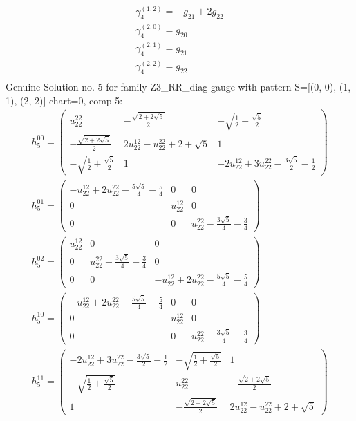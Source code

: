 \documentclass[a4paper, 11pt, twoside, onecolumn]{article}
\begin{document}
\begin{landscape}
\begin{gather*}
	 \gamma^{(1, 2)}_4=- g_{21} + 2 g_{22}\\ 
	 \gamma^{(2, 0)}_4=g_{20}\\ 
	 \gamma^{(2, 1)}_4=g_{21}\\ 
	 \gamma^{(2, 2)}_4=g_{22}\\ 
\end{gather*} 
Genuine Solution no. 5 for family Z3_RR_diag-gauge with pattern S=[(0, 0), (1, 1), (2, 2)] chart=0, comp 5: 
\begin{gather*} 
	 h_5^{00}=\begin{pmatrix}u^{22}_{22} & - \frac{\sqrt{2 + 2 \sqrt{5}}}{2} & - \sqrt{\frac{1}{2} + \frac{\sqrt{5}}{2}}\\- \frac{\sqrt{2 + 2 \sqrt{5}}}{2} & 2 u^{12}_{22} - u^{22}_{22} + 2 + \sqrt{5} & 1\\- \sqrt{\frac{1}{2} + \frac{\sqrt{5}}{2}} & 1 & - 2 u^{12}_{22} + 3 u^{22}_{22} - \frac{3 \sqrt{5}}{2} - \frac{1}{2}\end{pmatrix}\\ 
	 h_5^{01}=\begin{pmatrix}- u^{12}_{22} + 2 u^{22}_{22} - \frac{5 \sqrt{5}}{4} - \frac{5}{4} & 0 & 0\\0 & u^{12}_{22} & 0\\0 & 0 & u^{22}_{22} - \frac{3 \sqrt{5}}{4} - \frac{3}{4}\end{pmatrix}\\ 
	 h_5^{02}=\begin{pmatrix}u^{12}_{22} & 0 & 0\\0 & u^{22}_{22} - \frac{3 \sqrt{5}}{4} - \frac{3}{4} & 0\\0 & 0 & - u^{12}_{22} + 2 u^{22}_{22} - \frac{5 \sqrt{5}}{4} - \frac{5}{4}\end{pmatrix}\\ 
	 h_5^{10}=\begin{pmatrix}- u^{12}_{22} + 2 u^{22}_{22} - \frac{5 \sqrt{5}}{4} - \frac{5}{4} & 0 & 0\\0 & u^{12}_{22} & 0\\0 & 0 & u^{22}_{22} - \frac{3 \sqrt{5}}{4} - \frac{3}{4}\end{pmatrix}\\ 
	 h_5^{11}=\begin{pmatrix}- 2 u^{12}_{22} + 3 u^{22}_{22} - \frac{3 \sqrt{5}}{2} - \frac{1}{2} & - \sqrt{\frac{1}{2} + \frac{\sqrt{5}}{2}} & 1\\- \sqrt{\frac{1}{2} + \frac{\sqrt{5}}{2}} & u^{22}_{22} & - \frac{\sqrt{2 + 2 \sqrt{5}}}{2}\\1 & - \frac{\sqrt{2 + 2 \sqrt{5}}}{2} & 2 u^{12}_{22} - u^{22}_{22} + 2 + \sqrt{5}\end{pmatrix}\\ 

\end{gather*}
\end{landscape}
\end{document}
